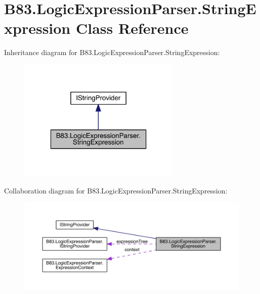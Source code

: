 \hypertarget{class_b83_1_1_logic_expression_parser_1_1_string_expression}{}\section{B83.\+Logic\+Expression\+Parser.\+String\+Expression Class Reference}
\label{class_b83_1_1_logic_expression_parser_1_1_string_expression}


Inheritance diagram for B83.\+Logic\+Expression\+Parser.\+String\+Expression\+:\nopagebreak
\begin{figure}[H]
\begin{center}
\leavevmode
\includegraphics[width=220pt]{class_b83_1_1_logic_expression_parser_1_1_string_expression__inherit__graph}
\end{center}
\end{figure}


Collaboration diagram for B83.\+Logic\+Expression\+Parser.\+String\+Expression\+:\nopagebreak
\begin{figure}[H]
\begin{center}
\leavevmode
\includegraphics[width=350pt]{class_b83_1_1_logic_expression_parser_1_1_string_expression__coll__graph}
\end{center}
\end{figure}
